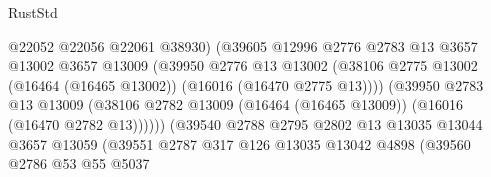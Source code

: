 \begin{lexlean}{RustStd}
\begin{coremodule}
                                          @22052
                                          @22056
                                          @22061
                                          @38930)
                                        (@39605
                                          @12996
                                          @2776
                                          @2783
                                          @13
                                          @3657
                                          @13002
                                          @3657
                                          @13009
                                          (@39950
                                            @2776
                                            @13
                                            @13002
                                            (@38106
                                              @2775
                                              @13002
                                              (@16464 (@16465 @13002))
                                              (@16016 (@16470 @2775 @13))))
                                          (@39950
                                            @2783
                                            @13
                                            @13009
                                            (@38106
                                              @2782
                                              @13009
                                              (@16464 (@16465 @13009))
                                              (@16016 (@16470 @2782 @13))))))
                                      (@39540
                                        @2788
                                        @2795
                                        @2802
                                        @13
                                        @13035
                                        @13044
                                        @3657
                                        @13059
                                        (@39551
                                          @2787
                                          @317
                                          @126
                                          @13035
                                          @13042
                                          @4898
                                          (@39560
                                            @2786
                                            @53
                                            @55
                                            @5037

\end{coremodule}
\end{lexlean}
